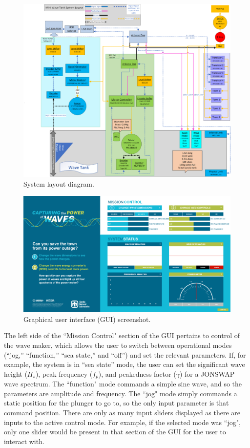 \documentclass[11pt, letterpaper]{article}
\begin{document}
\begin{figure}[tb]
  \centering
  \includegraphics[width=1\textwidth]{diagrams/SystemLayout.png}
  \caption{System layout diagram.}
  \label{fig:siweed_layout}
\end{figure}
\begin{figure}[tb]
  \centering
  \includegraphics[width=1\textwidth]{diagrams/siweed_guiScreenShot.png}
  \caption{Graphical user interface (GUI) screenshot.}
  \label{fig:siweed_guiScreenShot}
\end{figure}

The left side of the ``Mission Control" section of the GUI pertains to control of the wave maker, which allows the user to switch between operational modes (``jog,'' ``function,'' ``sea state,'' and ``off'') and set the relevant parameters.
If, for example, the system is in ``sea state'' mode, the user can set the significant wave height ($H_s$), peak frequency ($f_p$), and peakedness factor ($\gamma$) for a JONSWAP wave spectrum.
The ``function" mode commands a simple sine wave, and so the parameters are amplitude and frequency. 
The ``jog" mode simply commands a static position for the plunger to go to, so the only input parameter is that command position.
There are only as many input sliders displayed as there are inputs to the active control mode. 
For example, if the selected mode was ``jog", only one slider would be present in that section of the GUI for the user to interact with.
\end{document}
